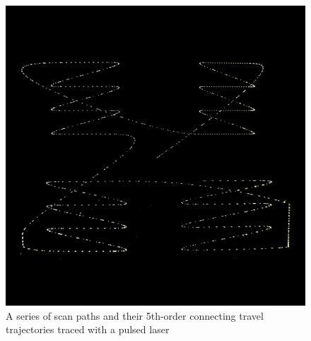 \begin{figure}
    \centering
    \includegraphics[width=\linewidth]{Pictures/5th-order-high-contrast.png}
    \caption{A series of scan paths and their 5th-order connecting travel trajectories traced with a pulsed laser}
    \label{fig:5th-order-high-contrast}
\end{figure}

